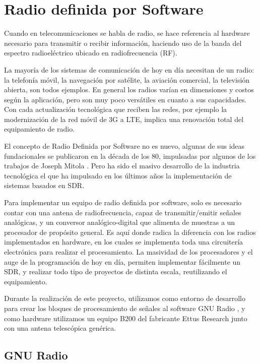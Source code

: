 \chapter{Radio definida por Software}

Cuando en telecomunicaciones se habla de radio, se hace referencia al hardware necesario para transmitir o recibir información, haciendo uso de la banda del espectro radioeléctrico ubicado en radiofrecuencia (RF).

La mayoría de los sistemas de comunicación de hoy en día necesitan de un radio: la telefonía móvil,  la navegación por satélite, la aviación comercial, la televisión abierta, son todos ejemplos. En general los radios varían en dimensiones y costos según la aplicación, pero son muy poco versátiles en cuanto a sus capacidades. Con cada actualización tecnológica que reciben las redes, por ejemplo la modernización de la red móvil de 3G a LTE, implica una renovación total del equipamiento de radio. 

El concepto de Radio Definida por Software no es nuevo, algunas de sus ideas fundacionales se publicaron en la década de los 80, impulsadas por algunos de los trabajos de Joseph Mitola \cite{mitola_SDR}. Pero ha sido el masivo desarrollo de la industria tecnológica el que ha impulsado en los últimos años la implementación de sistemas basados en SDR. 

Para implementar un equipo de radio definida por software, solo es necesario contar con una antena de radiofrecuencia, capaz de transmitir/emitir señales analógicas, y un conversor analógico-digital que alimenta de muestras a un procesador de propósito general. Es aquí donde radica la diferencia con los radios implementados en hardware, en los cuales se implementa toda una circuitería electrónica para realizar el procesamiento. La masividad de los procesadores y el auge de la programación de hoy en día, permiten implementar fácilmente un SDR, y realizar todo tipo de proyectos de distinta escala, reutilizando el equipamiento. 

Durante la realización de este proyecto, utilizamos como entorno de desarrollo para crear los bloques de procesamiento de señales al software GNU Radio \cite{GNURadio}, y como hardware utilizamos un equipo B200 del fabricante Ettus Research \cite{EttusResearch} junto con una antena telescópica genérica. 

\section{GNU Radio}

